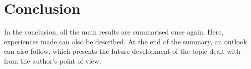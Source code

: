 
\chapter{Conclusion}
\label{chapter:conclusions}

In the conclusion, all the main results are summarised once again. Here, experiences made can also be described. At the end of the summary, an outlook can also follow, which presents the future development of the topic dealt with from the author's point of view.
